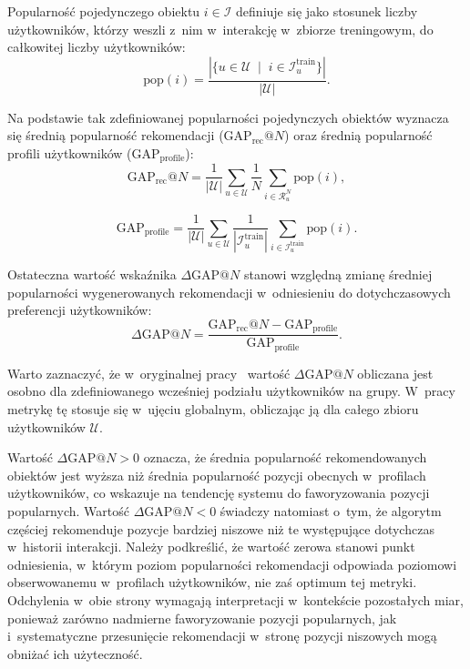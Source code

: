 Popularność pojedynczego obiektu $i \in \mathcal{I}$ definiuje się jako stosunek liczby użytkowników, którzy weszli z~nim w~interakcję w~zbiorze treningowym, do całkowitej liczby użytkowników:
\begin{equation}
    \text{pop}(i) = \frac{\left| \{ u \in \mathcal{U} \;\mid\; i \in \mathcal{I}_u^{\text{train}} \} \right|}{|\mathcal{U}|}.
\end{equation}

Na podstawie tak zdefiniowanej popularności pojedynczych obiektów wyznacza się średnią popularność rekomendacji ($\text{GAP}_{\text{rec}}@N$) oraz średnią popularność profili użytkowników ($\text{GAP}_{\text{profile}}$):
\begin{equation}
    \text{GAP}_{\text{rec}}@N = \frac{1}{|\mathcal{U}|} \sum_{u \in \mathcal{U}} \frac{1}{N} \sum_{i \in \mathcal{R}_u^N} \text{pop}(i),
\end{equation}

\begin{equation}
    \text{GAP}_{\text{profile}} = \frac{1}{|\mathcal{U}|} \sum_{u \in \mathcal{U}} \frac{1}{\left| \mathcal{I}_u^{\text{train}} \right|} \sum_{i \in \mathcal{I}_u^{\text{train}}} \text{pop}(i).
\end{equation}

Ostateczna wartość wskaźnika $\Delta\text{GAP}@N$ stanowi względną zmianę średniej popularności wygenerowanych rekomendacji w~odniesieniu do dotychczasowych preferencji użytkowników:
\begin{equation}
    \Delta\text{GAP}@N = \frac{\text{GAP}_{\text{rec}}@N - \text{GAP}_{\text{profile}}}{\text{GAP}_{\text{profile}}}.
\end{equation}

Warto zaznaczyć, że w~oryginalnej pracy~\cite{abdollahpouri2019unfairness} wartość $\Delta\text{GAP}@N$ obliczana jest osobno dla zdefiniowanego wcześniej podziału użytkowników na grupy. W~pracy metrykę tę stosuje się w~ujęciu globalnym, obliczając ją dla całego zbioru użytkowników $\mathcal{U}$.

Wartość $\Delta\text{GAP}@N > 0$ oznacza, że średnia popularność rekomendowanych obiektów jest wyższa niż średnia popularność pozycji obecnych w~profilach użytkowników, co wskazuje na tendencję systemu do faworyzowania pozycji popularnych. Wartość $\Delta\text{GAP}@N < 0$ świadczy natomiast o~tym, że algorytm częściej rekomenduje pozycje bardziej niszowe niż te występujące dotychczas w~historii interakcji. Należy podkreślić, że wartość zerowa stanowi punkt odniesienia, w~którym poziom popularności rekomendacji odpowiada poziomowi obserwowanemu w~profilach użytkowników, nie zaś optimum tej metryki. Odchylenia w~obie strony wymagają interpretacji w~kontekście pozostałych miar, ponieważ zarówno nadmierne faworyzowanie pozycji popularnych, jak i~systematyczne przesunięcie rekomendacji w~stronę pozycji niszowych mogą obniżać ich użyteczność.

